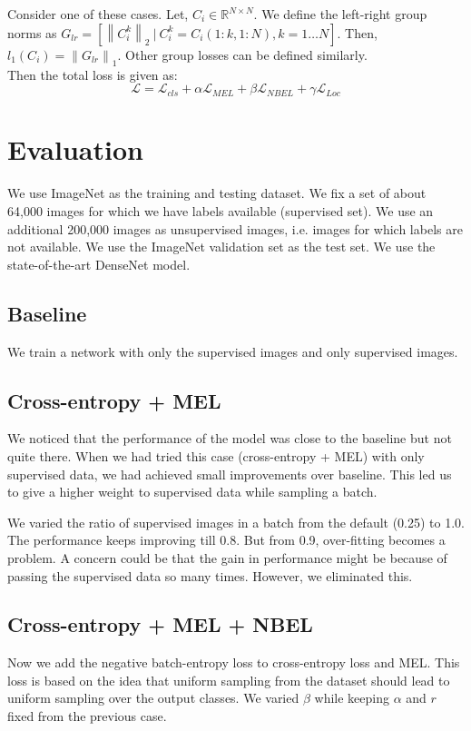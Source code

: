 \documentclass[runningheads]{llncs}
\begin{document}
Consider one of these cases. Let, $C_i \in \mathbb{R}^{N \times N}$. We define the left-right group
norms as $G_{lr} = [\left\lVert C^{k}_i \right\rVert_2~|~C^{k}_i = C_i(1:k,1:N), k = 1 \dots N]$. Then,
$l_1(C_i) = \left\lVert G_{lr} \right\rVert_1$. Other group losses can be defined similarly.\\

Then the total loss is given as:
\begin{equation}
	\mathcal{L} = \mathcal{L}_{cls} + \alpha \mathcal{L}_{MEL} + \beta \mathcal{L}_{NBEL} + \gamma
	\mathcal{L}_{Loc}
\end{equation}


\section{Evaluation}
We use ImageNet as the training and testing dataset. We fix a set of about 64,000 images for which
we have labels available (supervised set). We use an additional 200,000 images as unsupervised
images, i.e. images for which labels are not available. We use the ImageNet validation set as the
test set. We use the state-of-the-art DenseNet model.

\subsection{Baseline}
We train a network with only the supervised images and only supervised images.

\subsection{Cross-entropy + MEL}

We noticed that the performance of the model was close to the baseline but not quite there. When we
had tried this case (cross-entropy + MEL) with only supervised data, we had achieved small
improvements over baseline. This led us to give a higher weight to supervised data while sampling a
batch. 

We varied the ratio of supervised images in  a batch from the default (0.25) to 1.0. The performance
keeps improving till 0.8. But from 0.9, over-fitting becomes a problem. A concern could be that the
gain in performance might be because of passing the supervised data so many times. However, we
eliminated this.

\subsection{Cross-entropy + MEL + NBEL}
Now we add the negative batch-entropy loss to cross-entropy loss and MEL. This loss is based on the
idea that uniform sampling from the dataset should lead to uniform sampling over the output classes.
We varied $\beta$ while keeping $\alpha$ and $r$ fixed from the previous case. 
\end{document}
